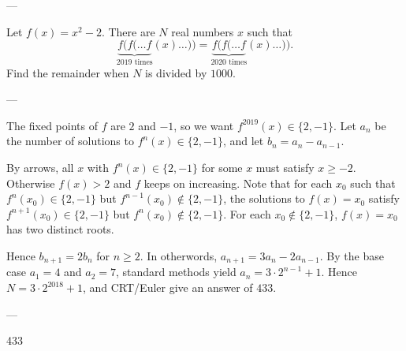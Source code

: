 
---

Let $f(x)=x^2-2$. There are $N$ real numbers $x$ such that \[\underbrace{f(f(\ldots f}_{2019\text{ times}}(x)\ldots))=\underbrace{f(f(\ldots f}_{2020\text{ times}}(x)\ldots)).\]
Find the remainder when $N$ is divided by $1000$. 

---

The fixed points of $f$ are $2$ and $-1$, so we want $f^{2019}(x)\in\{2,-1\}$. Let $a_n$ be the number of solutions to $f^n(x)\in\{2,-1\}$, and let $b_n=a_n-a_{n-1}$.

By arrows, all $x$ with $f^n(x)\in\{2,-1\}$ for some $x$ must satisfy $x\ge-2$. Otherwise $f(x)>2$ and $f$ keeps on increasing. Note that for each $x_0$ such that $f^n(x_0)\in\{2,-1\}$ but $f^{n-1}(x_0)\notin\{2,-1\}$, the solutions to $f(x)=x_0$ satisfy $f^{n+1}(x_0)\in\{2,-1\}$ but $f^n(x_0)\notin\{2,-1\}$. For each $x_0\notin\{2,-1\}$, $f(x)=x_0$ has two distinct roots.

Hence $b_{n+1}=2b_n$ for $n\ge2$. In otherwords, $a_{n+1}=3a_n-2a_{n-1}$. By the base case $a_1=4$ and $a_2=7$, standard methods yield $a_n=3\cdot2^{n-1}+1$. Hence $N=3\cdot2^{2018}+1$, and CRT/Euler give an answer of $433$.

---

433
